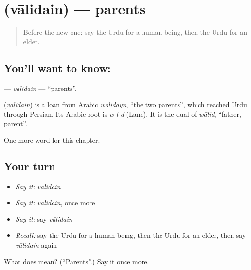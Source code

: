 \section[\texorpdfstring{\ur{والدین} (vālidain)}{والدین (vālidain)}]{ (vālidain) — parents}

\label{lesson:UR-C170-validain}



\begin{quote}
Before the new one: say the Urdu for a human being, then the Urdu for an elder.
\end{quote}

\subsection*{You'll want to know: }
\textbf{} — \emph{vālidain} — \textquotedblleft{}parents\textquotedblright{}.

\begin{cousinweb}
\textbf{} (\emph{vālidain}) is a loan from Arabic \emph{wālidayn}, \textquotedblleft{}the two parents\textquotedblright{}, which reached Urdu through Persian. Its Arabic root is \emph{w-l-d} (Lane). It is the dual of \emph{wālid}, \textquotedblleft{}father, parent\textquotedblright{}.
\end{cousinweb}

\begin{grammarlens}[title={What you've built}]
One more word for this chapter.
\end{grammarlens}

\subsection*{Your turn}
\begin{itemize}
\raggedright
  \item \emph{Say it:} \emph{vālidain}
  \item \emph{Say it:} \emph{vālidain}, once more
  \item \emph{Say it:} say \emph{vālidain}
  \item \emph{Recall:} say the Urdu for a human being, then the Urdu for an elder, then say \emph{vālidain} again
\end{itemize}

\begin{tcolorbox}[breakable,colback=teal!4,colframe=teal!35!black,title={Before you move on}]
What does  mean? (\textquotedblleft{}Parents\textquotedblright{}.) Say it once more.
\end{tcolorbox}
